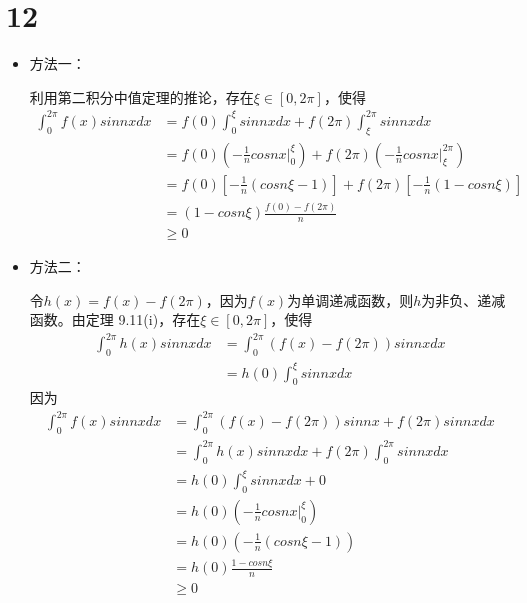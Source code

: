 \documentclass{article}
\begin{document}
\section*{12}

\begin{itemize}
  \item 方法一：

        利用第二积分中值定理的推论，存在$\xi \in [0, 2\pi]$，使得
        \begin{align*}
          \int_{0}^{2\pi} f(x) sin nx dx
           & = f(0)\int_{0}^{\xi} sin nx dx + f(2\pi)\int_{\xi}^{2\pi} sin nx dx                               \\
           & = f(0) (- \frac{1}{n} cos nx\bigg|_{0}^{\xi}) + f(2\pi) (- \frac{1}{n} cos nx\bigg|_{\xi}^{2\pi}) \\
           & = f(0) [- \frac{1}{n} (cos n\xi - 1)] + f(2\pi) [-\frac{1}{n}(1 - cos n\xi)]                      \\
           & = (1 - cos n\xi) \frac{f(0)- f(2\pi)}{n}                                                          \\
           & \geq 0
        \end{align*}

  \item 方法二：

        令$h(x) = f(x) - f(2\pi)$，因为$f(x)$为单调递减函数，则$h$为非负、递减函数。由定理
        9.11(i)，存在$\xi \in [0, 2\pi]$，使得
        \begin{align*}
          \int_{0}^{2\pi} h(x) sin nx dx
           & = \int_{0}^{2\pi} (f(x) - f(2\pi)) sin nx dx \\
           & = h(0) \int_{0}^{\xi} sin nx dx
        \end{align*}
        因为
        \begin{align*}
          \int_{0}^{2\pi} f(x) sin nx dx
           & = \int_{0}^{2\pi} (f(x) - f(2\pi)) sin nx + f(2\pi)sin nx dx         \\
           & = \int_{0}^{2\pi} h(x) sin nx dx + f(2\pi) \int_{0}^{2\pi} sin nx dx \\
           & = h(0)\int_{0}^{\xi} sin nx dx + 0                                   \\
           & = h(0)(- \frac{1}{n} cos nx\bigg|_{0}^{\xi})                         \\
           & = h(0)(- \frac{1}{n} (cos n\xi - 1))                                 \\
           & = h(0)\frac{1 - cos n\xi}{n}                                         \\
           & \geq 0
        \end{align*}

\end{itemize}
\end{document}
